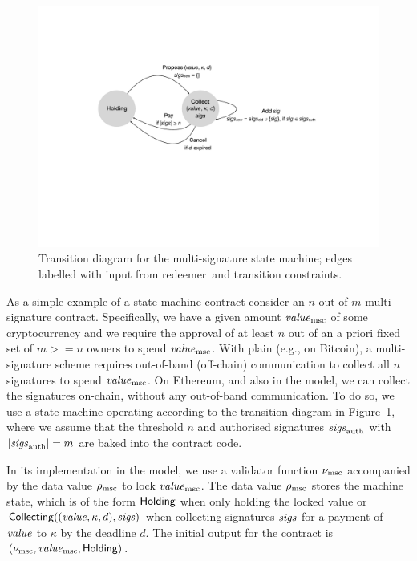 \begin{figure}[t]
  \centering 
  \includegraphics[width=\textwidth]{EUTxO_MultiSig_States.pdf}
  \caption{Transition diagram for the multi-signature state machine; edges labelled with input from redeemer and transition constraints.}
  \label{fig:multisig-machine}
\end{figure}
%
As a simple example of a state machine contract consider an $n$ out of $m$ multi-signature contract. Specifically, we have a given amount $\mathit{value}_{\mathrm{msc}}$ of some cryptocurrency and we require the approval of at least $n$ out of an a priori fixed set of $m >= n$ owners to spend $\mathit{value}_{\mathrm{msc}}$. With plain \UTXO{} (e.g., on Bitcoin), a multi-signature scheme requires out-of-band (off-chain) communication to collect all $n$ signatures to spend $\mathit{value}_{\mathrm{msc}}$. On Ethereum, and also in the \EUTXO{} model, we can collect the signatures on-chain, without any out-of-band communication. To do so, we use a state machine operating according to the transition diagram in Figure~\ref{fig:multisig-machine}, where we assume that the threshold $n$ and authorised signatures $\mathit{sigs}_{\mathrm{auth}}$ with \(|\mathit{sigs}_{\mathrm{auth}}| = m\) are baked into the contract code.

In its implementation in the \EUTXO{} model, we use a validator function $\nu_{\mathrm{msc}}$ accompanied by the data value $\rho_{\mathrm{msc}}$ to lock $\mathit{value}_{\mathrm{msc}}$. The data value $\rho_{\mathrm{msc}}$ stores the machine state, which is of the form \(\mathsf{Holding}\) when only holding the locked value or \(\mathsf{Collecting}((\mathit{value}, \kappa, d), \mathit{sigs})\) when collecting signatures $\mathit{sigs}$ for a payment of $\mathit{value}$ to $\kappa$ by the deadline $d$. The initial output for the contract is \((\nu_{\mathrm{msc}}, \mathit{value}_{\mathrm{msc}}, \mathsf{Holding})\).

